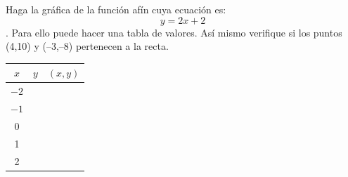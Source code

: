 \documentclass[fleqn]{article}
\begin{document}
\begin{enumerate}
\begin{minipage}{.3\textwidth}
\item Haga la gráfica de la función afín cuya ecuación es: \[y=2x+2\]. Para ello puede hacer una tabla de valores. Así mismo verifique si los puntos (4,10) y (--3,--8) pertenecen a la recta.
\end{minipage}
\begin{minipage}{.4\textwidth}
\end{minipage}
\begin{minipage}{.3\textwidth}
\begin{tabular}{|c|c|c|}
\hline 
$x$ & $y$ & $(x,y)$ \\ 
\hline 
$-2$ &  &  \\ 
\hline 
$-1$ &  &  \\ 
\hline 
0 &  &  \\ 
\hline 
1 &  &  \\ 
\hline 
2 &  &  \\ 
\hline 
\end{tabular} 
\end{minipage}\noanswer


\end{enumerate}
\end{document}
